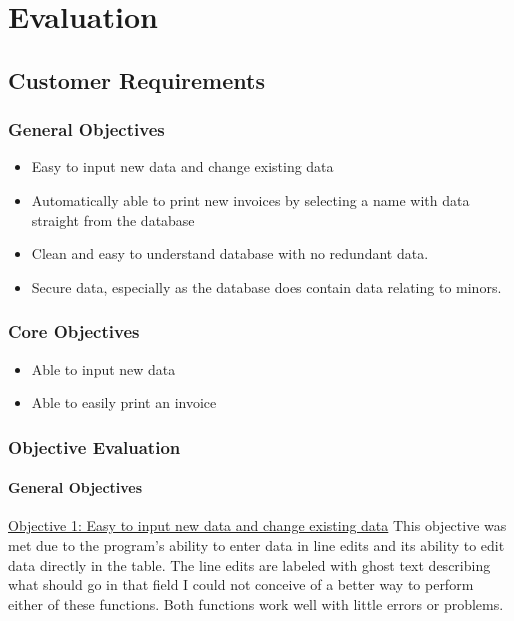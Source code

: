 \chapter{Evaluation}

\section{Customer Requirements}

\subsection{General Objectives}

\begin{itemize}
	\item Easy to input new data and change existing data
	\item Automatically able to print new invoices by selecting a name with data straight from the database
	\item Clean and easy to understand database with no redundant data.
	\item Secure data, especially as the database does contain data relating to minors.
\end{itemize}

\subsection{Core Objectives}
\begin{itemize}
	\item Able to input new data
	\item Able to easily print an invoice
\end{itemize}


\subsection{Objective Evaluation}

\subsubsection{General Objectives}
\underline{Objective 1: Easy to input new data and change existing data}
This objective was met due to the program's ability to enter data in line edits and its ability to edit data directly in the table. The line edits are labeled with ghost text describing what should go in that field I could not conceive of a better way to perform either of these functions. Both functions work well with little errors or problems.

